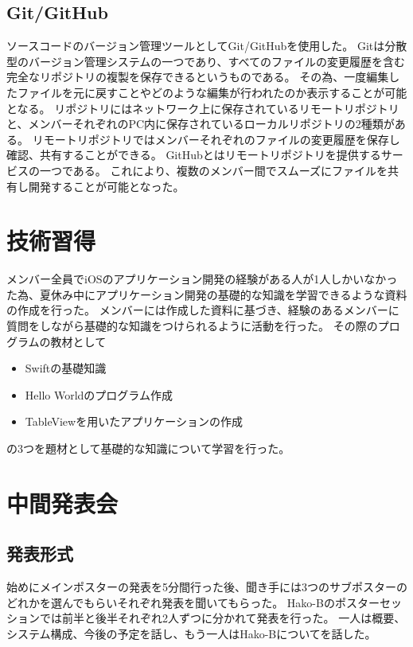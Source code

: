 \documentclass[openany,11pt,papersize]{jsbook}
\begin{document}

\subsection{Git/GitHub}
ソースコードのバージョン管理ツールとしてGit/GitHubを使用した。
Gitは分散型のバージョン管理システムの一つであり、すべてのファイルの変更履歴を含む完全なリポジトリの複製を保存できるというものである。
その為、一度編集したファイルを元に戻すことやどのような編集が行われたのか表示することが可能となる。
リポジトリにはネットワーク上に保存されているリモートリポジトリと、メンバーそれぞれのPC内に保存されているローカルリポジトリの2種類がある。
リモートリポジトリではメンバーそれぞれのファイルの変更履歴を保存し確認、共有することができる。
GitHubとはリモートリポジトリを提供するサービスの一つである。
これにより、複数のメンバー間でスムーズにファイルを共有し開発することが可能となった。


\section{技術習得}
メンバー全員でiOSのアプリケーション開発の経験がある人が1人しかいなかった為、夏休み中にアプリケーション開発の基礎的な知識を学習できるような資料の作成を行った。
メンバーには作成した資料に基づき、経験のあるメンバーに質問をしながら基礎的な知識をつけられるように活動を行った。
その際のプログラムの教材として
\begin{itemize}

\item Swiftの基礎知識
\item Hello Worldのプログラム作成
\item TableViewを用いたアプリケーションの作成

\end{itemize}
の3つを題材として基礎的な知識について学習を行った。


\section{中間発表会}
\subsection{発表形式}
始めにメインポスターの発表を5分間行った後、聞き手には3つのサブポスターのどれかを選んでもらいそれぞれ発表を聞いてもらった。
Hako-Bのポスターセッションでは前半と後半それぞれ2人ずつに分かれて発表を行った。
一人は概要、システム構成、今後の予定を話し、もう一人はHako-Bについてを話した。
\end{document}
